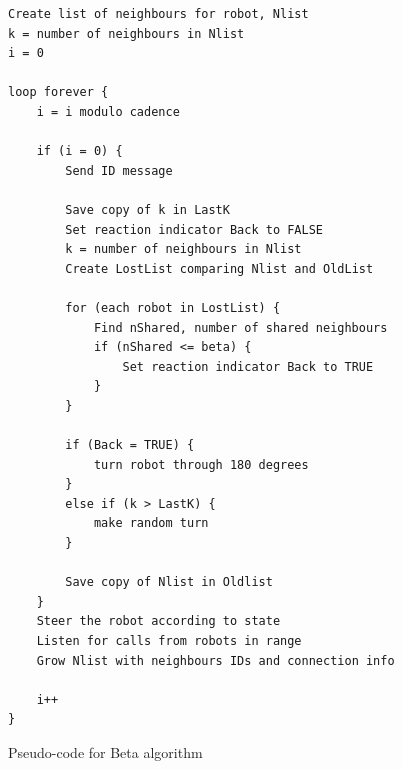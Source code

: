 \begin{figure}
\caption{Pseudo-code for Beta algorithm \cite{Nembrini2002}}
\begin{lstlisting}[style=code]
Create list of neighbours for robot, Nlist
k = number of neighbours in Nlist
i = 0

loop forever {
	i = i modulo cadence

	if (i = 0) {
		Send ID message

		Save copy of k in LastK
		Set reaction indicator Back to FALSE
		k = number of neighbours in Nlist
		Create LostList comparing Nlist and OldList

		for (each robot in LostList) {
			Find nShared, number of shared neighbours
			if (nShared <= beta) {
				Set reaction indicator Back to TRUE
			}
		}

		if (Back = TRUE) {
			turn robot through 180 degrees
		}
		else if (k > LastK) {
			make random turn
		}
		
		Save copy of Nlist in Oldlist
	}
	Steer the robot according to state
	Listen for calls from robots in range
	Grow Nlist with neighbours IDs and connection info

	i++
}
\end{lstlisting}
\label{fig:pseudocode}
\end{figure}




